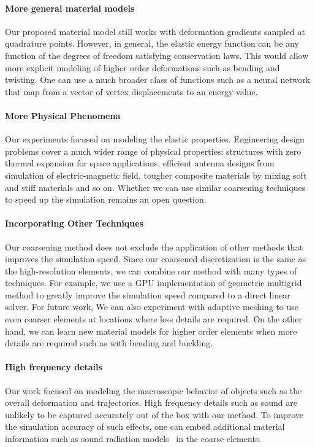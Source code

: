 \paragraph{More general material models}
Our proposed material model still works with deformation gradients sampled at quadrature points.
However, in general, the elastic energy function can be any function of the degrees of freedom satisfying conservation laws.
This would allow more explicit modeling of higher order deformations such as bending and twisting.
One can use a much broader class of functions such as a neural network that map from a vector of vertex displacements to an energy value.
\paragraph{More Physical Phenomena}
Our experiments focused on modeling the elastic properties.
Engineering design problems cover a much wider range of physical properties: structures with zero thermal expansion for space applications, 
efficient antenna designs from simulation of electric-magnetic field, 
tougher composite materials by mixing soft and stiff materials and so on.
Whether we can use similar coarsening techniques to speed up the simulation remains an open question.
\paragraph{Incorporating Other Techniques}
Our coarsening method does not exclude the application of other methods that improves the simulation speed.
Since our coarsened discretization is the same as the high-resolution elements, we can combine our method with many types of techniques.
For example, we use a GPU implementation of geometric multigrid method to greatly improve the simulation speed compared to a direct linear solver.
For future work,
We can also experiment with adaptive meshing to use even coarser elements at locations where less details are required. On the other hand, we can learn new material models for higher order elements when more details are required such as with bending and buckling.
\paragraph{High frequency details}
Our work focused on modeling the macroscopic behavior of objects such as the overall deformation and trajectories.
High frequency details such as sound are unlikely to be captured accurately out of the box with our method. To improve the simulation accuracy of such effects, one can embed additional material information such as sound radiation models~\citep{schweickart2017animating} in the coarse elements.
